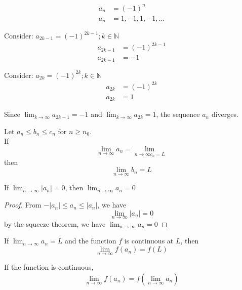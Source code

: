 \begin{equation}
  \nonumber
  \begin{aligned}
    a_{n} &= (-1)^{n} \\
    a_{n} &= 1, -1, 1, -1, \dots
  \end{aligned}
\end{equation}

Consider: $a_{2k-1} = (-1)^{2k-1}; k \in \mathbb{N}$
\begin{equation}
  \nonumber
  \begin{aligned}
    a_{2k-1} &= (-1)^{2k-1} \\
    a_{2k-1} &= -1
  \end{aligned}
\end{equation}

Consider: $a_{2k} = (-1)^{2k}; k \in \mathbb{N}$
\begin{equation}
  \nonumber
  \begin{aligned}
    a_{2k} &= (-1)^{2k} \\
    a_{2k} &= 1
  \end{aligned}
\end{equation}

Since $\lim_{k \to \infty} a_{2k-1} = -1$ and $\lim_{k \to \infty} a_{2k} = 1$, the sequence $a_{n}$ diverges.

\begin{theorem}
  Let \(a_{n} \le b_{n} \le c_{n}\) for \(n \ge n_{0}\). \\
  If 
  \[
    \lim_{n \to \infty} a_n = \lim_{n \to \infty c_n = L}
  \]
  then
  \[
    \lim_{n \to \infty} b_{n} = L
  \]
\end{theorem}

\begin{theorem}
  If \(\lim_{n \to \infty} |a_{n}| = 0\), then \(\lim_{n \to \infty} a_{n} = 0\) 
\end{theorem}

\begin{proof}
  From $-|a_{n}| \le a_{n} \le |a_{n}|$, we have
  \[
    \lim_{n \to \infty} |a_{n}| = 0
  \]
  by the squeeze theorem, we have $\lim_{n \to \infty} a_{n} = 0$
\end{proof}

\begin{theorem}
  If \(\lim_{n \to \infty} a_{n} = L\) and the function $f$ is continuous at $L$, then
  \[
    \lim_{n \to \infty} f(a_{n}) = f(L)
  \]
\end{theorem}

\begin{remark}
  If the function is continuous,
  \[
    \lim_{n \to \infty} f(a_{n}) = f(\lim_{n \to \infty} a_{n})
  \]
\end{remark}

